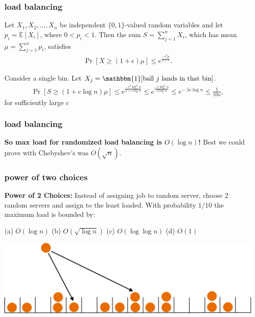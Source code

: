 \documentclass[compress]{beamer}
\newcommand{\E}{\mathbb{E}}
\begin{document}
\begin{frame}[t]
	\frametitle{load balancing}
	\begin{theorem}
		Let $X_1,X_2,\ldots,X_n$ be independent $\{0,1\}$-valued random variables and let
		$p_i = \E[X_i]$, where $0<p_i<1$.
		Then the sum $S = \sum_{j=1}^{n} X_i$, which has mean
		$\mu = \sum_{j=1}^{n} p_i$, satisfies
		\begin{align*}
			\Pr[X \geq (1+\epsilon)\mu] \leq e^{\frac{-\epsilon^2\mu}{2+ \epsilon}}.
		\end{align*}
	\end{theorem} 
	Consider a single bin. Let $X_j = \mathbbm{1}[\text{ball $j$ lands in that bin}]$. \vspace{2em}
	\begin{align*}
		\Pr[S \geq (1+c\log n)\mu] \leq e^{\frac{-c^2\log^2 n}{2 + c\log n}} \leq e^{\frac{-c\log^2 n}{2\log n}} \leq e^{-.5c\log n} \leq \frac{1}{10n},
	\end{align*}
	for sufficiently large $c$
	
\end{frame}

\begin{frame}
	\frametitle{load balancing}
	\begin{center}\alert{\textbf{So max load for randomized load balancing is $O(\log n)$!}} Best we could prove with Chebyshev's was $O(\sqrt{n})$. \end{center}
\end{frame}

\begin{frame}
	\frametitle{power of two choices}
	\textbf{Power of 2 Choices:} Instead of assigning job to random server, choose 2 random servers and assign to the least loaded. With probability $1/10$ the maximum load is bounded by:
	
	(a) $O(\log n)$ \hspace{1em} (b) $O(\sqrt{\log n})$  \hspace{1em}  (c) $O(\log \log n)$  \hspace{1em} (d) $O(1)$
	\begin{center}
		\includegraphics[width=.9\textwidth]{power_of_two.png}
	\end{center}
\end{frame}
\end{document}
